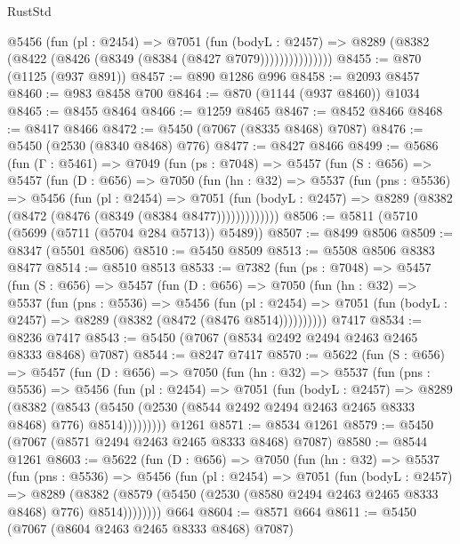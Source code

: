 \begin{lexlean}{RustStd}
\begin{coremodule}
                @5456
                  (fun (pl : @2454) =>
                  @7051
                    (fun (bodyL : @2457) =>
                    @8289 (@8382 (@8422 (@8426 (@8349 (@8384 (@8427 @7079)))))))))))))))
@8455 := @870 (@1125 (@937 @891))
@8457 := @890 @1286 @996
@8458 := @2093 @8457
@8460 := @983 @8458 @700
@8464 := @870 (@1144 (@937 @8460)) @1034
@8465 := @8455 @8464
@8466 := @1259 @8465
@8467 := @8452 @8466
@8468 := @8417 @8466
@8472 := @5450 (@7067 (@8335 @8468) @7087)
@8476 := @5450 (@2530 (@8340 @8468) @776)
@8477 := @8427 @8466
@8499 := @5686
    (fun (Γ : @5461) =>
    @7049
      (fun (ps : @7048) =>
      @5457
        (fun (S : @656) =>
        @5457
          (fun (D : @656) =>
          @7050
            (fun (hn : @32) =>
            @5537
              (fun (pns : @5536) =>
              @5456
                (fun (pl : @2454) =>
                @7051
                  (fun (bodyL : @2457) =>
                  @8289 (@8382 (@8472 (@8476 (@8349 (@8384 @8477)))))))))))))
@8506 := @5811 (@5710 (@5699 (@5711 (@5704 @284 @5713)) @5489))
@8507 := @8499 @8506
@8509 := @8347 (@5501 @8506)
@8510 := @5450 @8509
@8513 := @5508 @8506 @8383 @8477
@8514 := @8510 @8513
@8533 := @7382
    (fun (ps : @7048) =>
    @5457
      (fun (S : @656) =>
      @5457
        (fun (D : @656) =>
        @7050
          (fun (hn : @32) =>
          @5537
            (fun (pns : @5536) =>
            @5456
              (fun (pl : @2454) =>
              @7051 (fun (bodyL : @2457) => @8289 (@8382 (@8472 (@8476 @8514))))))))))
    @7417
@8534 := @8236 @7417
@8543 := @5450 (@7067 (@8534 @2492 @2494 @2463 @2465 @8333 @8468) @7087)
@8544 := @8247 @7417
@8570 := @5622
    (fun (S : @656) =>
    @5457
      (fun (D : @656) =>
      @7050
        (fun (hn : @32) =>
        @5537
          (fun (pns : @5536) =>
          @5456
            (fun (pl : @2454) =>
            @7051
              (fun (bodyL : @2457) =>
              @8289
                (@8382
                  (@8543
                    (@5450 (@2530 (@8544 @2492 @2494 @2463 @2465 @8333 @8468) @776) @8514)))))))))
    @1261
@8571 := @8534 @1261
@8579 := @5450 (@7067 (@8571 @2494 @2463 @2465 @8333 @8468) @7087)
@8580 := @8544 @1261
@8603 := @5622
    (fun (D : @656) =>
    @7050
      (fun (hn : @32) =>
      @5537
        (fun (pns : @5536) =>
        @5456
          (fun (pl : @2454) =>
          @7051
            (fun (bodyL : @2457) =>
            @8289
              (@8382 (@8579 (@5450 (@2530 (@8580 @2494 @2463 @2465 @8333 @8468) @776) @8514))))))))
    @664
@8604 := @8571 @664
@8611 := @5450 (@7067 (@8604 @2463 @2465 @8333 @8468) @7087)

\end{coremodule}
\end{lexlean}
